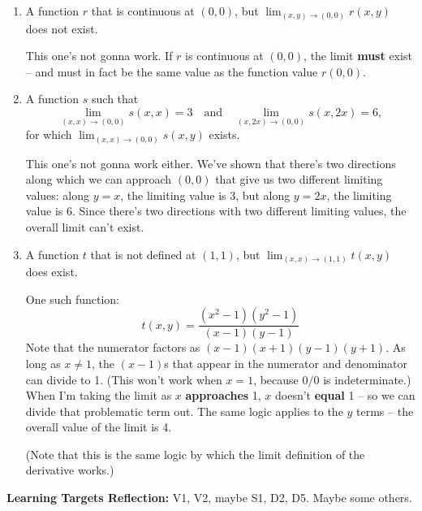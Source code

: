 \documentclass[10pt]{article}
\newenvironment{red}{\color{red}}{\ignorespacesafterend}
\begin{document}
\begin{enumerate}[leftmargin=0pt]
\begin{enumerate}
        \item A function $r$ that is continuous at $(0, 0)$, but $\lim_{(x, y) \to (0, 0)} r(x, y)$ does not exist.
        
        \begin{red}
            This one's not gonna work. If $r$ is continuous at $(0, 0)$, the limit \textbf{must} exist -- and must in fact be the same value as the function value $r(0,0)$.
        \end{red}
        
        \item A function $s$ such that 
        \[\lim_{(x, x) \to (0, 0)} s(x, x) = 3 \quad \textrm{and} \quad
        \lim_{(x, 2x) \to (0, 0)} s(x, 2x) = 6,\]
        for which $\lim_{(x, x) \to (0, 0)} s(x, y)$ exists.
        
        \begin{red}
            This one's not gonna work either. We've shown that there's two directions along which we can approach $(0, 0)$ that give us two different limiting values: along $y=x$, the limiting value is 3, but along $y=2x$, the limiting value is 6. Since there's two directions with two different limiting values, the overall limit can't exist.
        \end{red}
        
        \item A function $t$ that is not defined at $(1, 1)$, but $\lim_{(x, x) \to (1, 1)} t(x, y)$ does exist.
        
        \begin{red}
            One such function:
            \[t(x, y) = \frac{(x^2-1)(y^2-1)}{(x-1)(y-1)}\]
            Note that the numerator factors as $(x-1)(x+1)(y-1)(y+1)$. As long as $x\neq 1$, the $(x-1)$s that appear in the numerator and denominator can divide to 1. (This won't work when $x=1$, because $0/0$ is indeterminate.) When I'm taking the limit as $x$ \textbf{approaches} 1, $x$ doesn't \textbf{equal} 1 -- so we can divide that problematic term out. The same logic applies to the $y$ terms -- the overall value of the limit is 4.
            
            (Note that this is the same logic by which the limit definition of the derivative works.)
        \end{red}
    
    \end{enumerate}

\end{enumerate}

\begin{red}
\textbf{Learning Targets Reflection:} V1, V2, maybe S1, D2, D5. Maybe some others.
\end{red}
\end{document}
